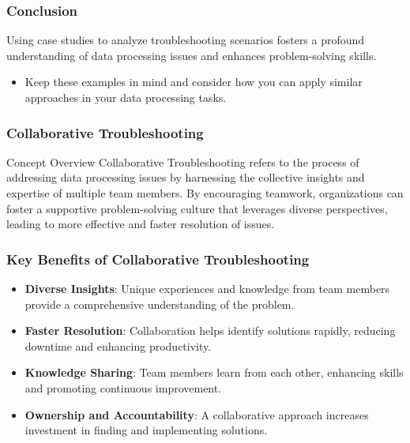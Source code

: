 \documentclass[aspectratio=169]{beamer}
\begin{document}
\begin{frame}[fragile]
  \frametitle{Conclusion}
  Using case studies to analyze troubleshooting scenarios fosters a profound understanding of data processing issues and enhances problem-solving skills. 
  \begin{itemize}
    \item Keep these examples in mind and consider how you can apply similar approaches in your data processing tasks.
  \end{itemize}
\end{frame}

\begin{frame}[fragile]
    \frametitle{Collaborative Troubleshooting}
    \begin{block}{Concept Overview}
        Collaborative Troubleshooting refers to the process of addressing data processing issues by harnessing the collective insights and expertise of multiple team members. By encouraging teamwork, organizations can foster a supportive problem-solving culture that leverages diverse perspectives, leading to more effective and faster resolution of issues.
    \end{block}
\end{frame}

\begin{frame}[fragile]
    \frametitle{Key Benefits of Collaborative Troubleshooting}
    \begin{itemize}
        \item \textbf{Diverse Insights}: Unique experiences and knowledge from team members provide a comprehensive understanding of the problem.
        \item \textbf{Faster Resolution}: Collaboration helps identify solutions rapidly, reducing downtime and enhancing productivity.
        \item \textbf{Knowledge Sharing}: Team members learn from each other, enhancing skills and promoting continuous improvement.
        \item \textbf{Ownership and Accountability}: A collaborative approach increases investment in finding and implementing solutions.
    \end{itemize}
\end{frame}
\end{document}
